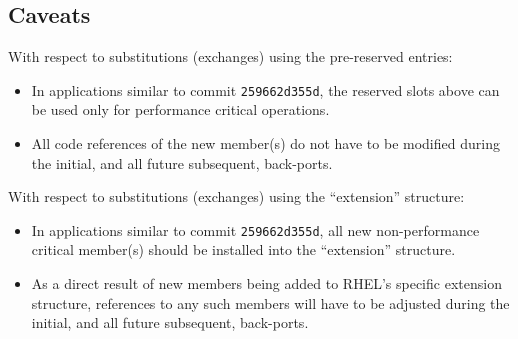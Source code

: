 \documentclass[10pt,oneside,english]{book}
\begin{document}
\subsection{Caveats}

With respect to substitutions (exchanges) using the pre-reserved entries:
\begin{itemize}
\item In applications similar to commit \texttt{259662d355d}, the reserved
slots above can be used only for performance critical operations.
\item All code references of the new member(s) do not have to be modified
during the initial, and all future subsequent, back-ports.
\end{itemize}
With respect to substitutions (exchanges) using the ``extension''
structure:
\begin{itemize}
\item In applications similar to commit \texttt{259662d355d}, all new non-performance
critical member(s) should be installed into the ``extension'' structure.
\item As a direct result of new members being added to RHEL's specific extension
structure, references to any such members will have to be adjusted
during the initial, and all future subsequent, back-ports.
\end{itemize}
\end{document}
